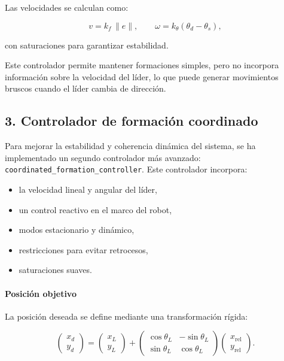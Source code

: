 Las velocidades se calculan como:



\[
v = k_f \, \|e\|, \qquad
\omega = k_\theta (\theta_d - \theta_s),
\]



con saturaciones para garantizar estabilidad.

Este controlador permite mantener formaciones simples, pero no incorpora
información sobre la velocidad del líder, lo que puede generar movimientos
bruscos cuando el líder cambia de dirección.

\subsection*{3. Controlador de formación coordinado}

Para mejorar la estabilidad y coherencia dinámica del sistema, se ha
implementado un segundo controlador más avanzado:
\texttt{coordinated\_formation\_controller}. Este controlador incorpora:

\begin{itemize}
    \item la velocidad lineal y angular del líder,
    \item un control reactivo en el marco del robot,
    \item modos estacionario y dinámico,
    \item restricciones para evitar retrocesos,
    \item saturaciones suaves.
\end{itemize}

\paragraph{Posición objetivo}

La posición deseada se define mediante una transformación rígida:

\begin{equation}
\begin{pmatrix}
x_d \\ y_d
\end{pmatrix}
=
\begin{pmatrix}
x_L \\ y_L
\end{pmatrix}
+
\begin{pmatrix}
\cos\theta_L & -\sin\theta_L \\
\sin\theta_L & \cos\theta_L
\end{pmatrix}
\begin{pmatrix}
x_{\text{rel}} \\ y_{\text{rel}}
\end{pmatrix}.
\label{eq:t3_target}
\end{equation}

